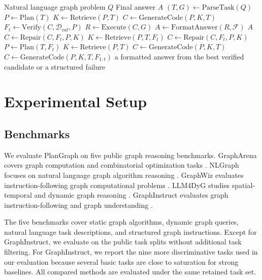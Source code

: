 \documentclass[pdflatex,sn-mathphys-num]{sn-jnl}
\theoremstyle{thmstyleone}
\theoremstyle{thmstyletwo}
\theoremstyle{thmstylethree}
\begin{document}
\begin{algorithm}[t]
\caption{PlanGraph solving process}
\label{alg:plangraph}
\begin{algorithmic}[1]
\Require Natural language graph problem $Q$
\Ensure Final answer $A$
\State $(T,G) \gets \mathrm{ParseTask}(Q)$
\State $P \gets \mathrm{Plan}(T)$
\State $K \gets \mathrm{Retrieve}(P,T)$
\State $C \gets \mathrm{GenerateCode}(P,K,T)$
  \State $F_t \gets \mathrm{Verify}(C,\mathcal{D}_{val},P)$
    \State $R \gets \mathrm{Execute}(C,G)$
    \State $A \gets \mathrm{FormatAnswer}(R,\mathcal{F})$
    \State \Return $A$
    \State $C \gets \mathrm{Repair}(C,F_t,P,K)$
    \State $K \gets \mathrm{Retrieve}(P,T,F_t)$
    \State $C \gets \mathrm{Repair}(C,F_t,P,K)$
    \State $P \gets \mathrm{Plan}(T,F_t)$
    \State $K \gets \mathrm{Retrieve}(P,T)$
    \State $C \gets \mathrm{GenerateCode}(P,K,T)$
  \EndIf
    \State $C \gets \mathrm{GenerateCode}(P,K,T,F_{1:t})$
  \EndIf
\EndFor
\State \Return a formatted answer from the best verified candidate or a structured failure
\end{algorithmic}
\end{algorithm}

\section{Experimental Setup}\label{sec:setup}

\subsection{Benchmarks}

We evaluate PlanGraph on five public graph reasoning benchmarks. GraphArena covers graph computation and combinatorial optimization tasks \cite{tang2025grapharena}. NLGraph focuses on natural language graph algorithm reasoning \cite{chen2024nlgraph}. GraphWiz evaluates instruction-following graph computational problems \cite{gong2024graphwiz}. LLM4DyG studies spatial-temporal and dynamic graph reasoning \cite{llm4dyg2024}. GraphInstruct evaluates graph instruction-following and graph understanding \cite{graphinstruct2024}.

The five benchmarks cover static graph algorithms, dynamic graph queries, natural language task descriptions, and structured graph instructions. Except for GraphInstruct, we evaluate on the public task splits without additional task filtering. For GraphInstruct, we report the nine more discriminative tasks used in our evaluation because several basic tasks are close to saturation for strong baselines. All compared methods are evaluated under the same retained task set.
\end{document}
